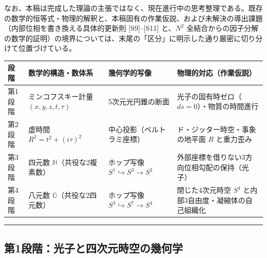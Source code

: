 \documentclass[
  a4paper,
]{ltjsarticle}
\newcounter{none} %
\begin{document}
なお、本稿は完成した理論の主張ではなく、現在進行中の思考整理である。既存の数学的恒等式・物理的解釈と、本稿固有の作業仮説、および未解決の導出課題（内部位相を書き換える具体的更新則
{[}S9{]}--{[}S11{]} と、\(N^2\)
全結合からの因子分解の数学的証明）の境界については、末尾の「区分」に明示した通り厳密に切り分けて位置づけている。

{\def\LTcaptype{none} %
\begin{longtable}[]{@{}
  >{\raggedright\arraybackslash}p{}
  >{\raggedright\arraybackslash}p{}
  >{\raggedright\arraybackslash}p{}
  >{\raggedright\arraybackslash}p{}@{}}
\toprule\noalign{}
\begin{minipage}[b]{\linewidth}\raggedright
段階
\end{minipage} & \begin{minipage}[b]{\linewidth}\raggedright
数学的構造・数体系
\end{minipage} & \begin{minipage}[b]{\linewidth}\raggedright
幾何学的写像
\end{minipage} & \begin{minipage}[b]{\linewidth}\raggedright
物理的対応（作業仮説）
\end{minipage} \\
\midrule\noalign{}
\endhead
\bottomrule\noalign{}
\endlastfoot
第1段階 & ミンコフスキー計量 \((x,y,z,t,\tau)\) & 5次元光円錐の断面 &
光子の固有時ゼロ（\(ds=0\)）・物質の時間進行 \\
第2段階 & 虚時間 \(R^2 = t^2 + (i\tau)^2\) & 中心投影（ベルトラミ座標）
& ド・ジッター時空・事象の地平面 \(R\) と重力歪み \\
第3段階 & 四元数 \(\mathbb{H}\)（共役な2複素数） & ホップ写像
\(S^1 \hookrightarrow S^3 \to S^2\) &
外部座標を借りない3方向位相勾配の保持（光子） \\
第4段階 & 八元数 \(\mathbb{O}\)（共役な2四元数） & ホップ写像
\(S^3 \hookrightarrow S^7 \to S^4\) & 閉じた4次元時空 \(S^4\)
と内部3自由度・凝縮体の自己組織化 \\
\end{longtable}
}

\begin{center}\rule{0.5\linewidth}{0.5pt}\end{center}

\subsection{第1段階：光子と四次元時空の幾何学}\label{ux7b2c1ux6bb5ux968eux5149ux5b50ux3068ux56dbux6b21ux5143ux6642ux7a7aux306eux5e7eux4f55ux5b66}
\end{document}
